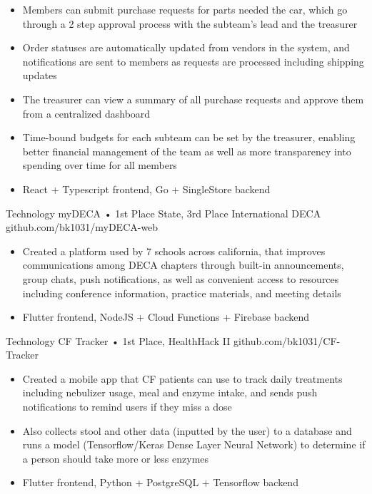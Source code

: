 \documentclass[9pt]{developercv} %
\begin{document}
\begin{entrylist}
{\begin{itemize}[noitemsep,topsep=0pt,parsep=0pt,partopsep=0pt, leftmargin=10pt]
            \item Members can submit purchase requests for parts needed the car, which go through a 2 step approval process with the subteam's lead and the treasurer
            \item Order statuses are automatically updated from vendors in the system, and notifications are sent to members as requests are processed including shipping updates
            \item The treasurer can view a summary of all purchase requests and approve them from a centralized dashboard
            \item Time-bound budgets for each subteam can be set by the treasurer, enabling better financial management of the team as well as more transparency into spending over time for all members
            \item React + Typescript frontend, Go + SingleStore backend
        \end{itemize}}
    \entry
		{Technology}
		{myDECA • 1st Place State, 3rd Place International DECA}
		{github.com/bk1031/myDECA-web}
        {\vspace{-8pt}
        \begin{itemize}[noitemsep,topsep=0pt,parsep=0pt,partopsep=0pt, leftmargin=10pt]
            \item Created a platform used by 7 schools across california, that improves communications among DECA chapters through built-in announcements, group chats, push notifications, as well as convenient access to resources including conference information, practice materials, and meeting details
            \item Flutter frontend, NodeJS + Cloud Functions + Firebase backend
        \end{itemize}}
    \entry
		{Technology}
		{CF Tracker • 1st Place, HealthHack II}
		{github.com/bk1031/CF-Tracker}
        {\vspace{-8pt}
        \begin{itemize}[noitemsep,topsep=0pt,parsep=0pt,partopsep=0pt, leftmargin=10pt]
            \item Created a mobile app that CF patients can use to track daily treatments including nebulizer usage, meal and enzyme intake, and sends push notifications to remind users if they miss a dose
            \item Also collects stool and other data (inputted by the user) to a database and runs a model (Tensorflow/Keras Dense Layer Neural Network) to determine if a person should take more or less enzymes
            \item Flutter frontend, Python + PostgreSQL + Tensorflow backend
        \end{itemize}}
\end{entrylist}
\end{document}
